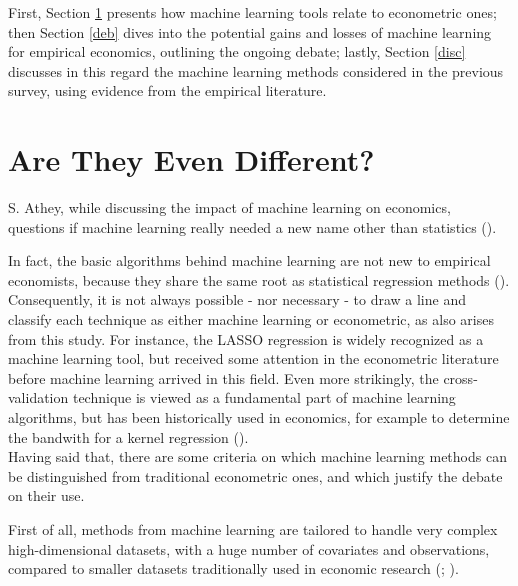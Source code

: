 \documentclass[12pt,a4paper,openright,twoside]{book}
\begin{document}
\begin{doublespacing}
First, Section \ref{diff} presents how machine learning tools relate to econometric ones; then Section \ref{deb} dives into the potential gains and losses of machine learning for empirical economics, outlining the ongoing debate; lastly, Section \ref{disc} discusses in this regard the machine learning methods considered in the previous survey, using evidence from the empirical literature.


\section{Are They Even Different?} \label{diff}
S. Athey, while discussing the impact of machine learning on economics, questions if machine learning really needed a new name other than statistics (\citealp{athey2019}). 

In fact, the basic algorithms behind machine learning are not new to empirical economists, because they share the same root as statistical regression methods (\citealp{efron2020prediction}). Consequently, it is not always possible - nor necessary - to draw a line and classify each technique as either machine learning or econometric, as also arises from this study. For instance, the LASSO regression is widely recognized as a machine learning tool, but received some attention in the econometric literature before machine learning arrived in this field. Even more strikingly, the cross-validation technique is viewed as a fundamental part of machine learning algorithms, but has been historically used in economics, for example to determine the bandwith for a kernel regression (\citealp{athey2019}). \\

Having said that, there are some criteria on which machine learning methods can be distinguished from traditional econometric ones, and which justify the debate on their use.

First of all, methods from machine learning are tailored to handle very complex high-dimensional datasets, with a huge number of covariates and observations, compared to smaller datasets traditionally used in economic research (\citealp{bankarticle}; \citealp{efron2020prediction}).


\end{doublespacing}
\end{document}
